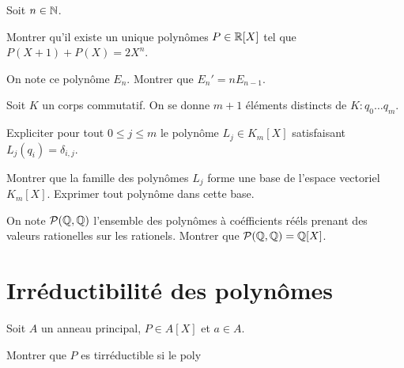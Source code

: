 \documentclass[french]{report}
\begin{document}
\begin{exo}
    Soit \(n\in\mathbb{N}\).
    \begin{q}{1}
        Montrer qu'il existe un unique polynômes \(P\in\mathbb{R}[X]\) tel que
        \(P(X+1)+P(X) = 2X^n\).
    \end{q}
    \begin{q}{2}
        On note ce polynôme \(E_n\). Montrer que \(E_n'=nE_{n-1}\).
    \end{q}
\end{exo}

\begin{exo}
    Soit \(K\) un corps commutatif. On se donne \(m+1\) éléments distincts de \(K\colon
    q_0\dots q_m\).
    \begin{q}{1}
        Expliciter pour tout \(0\leq j\leq m\) le polynôme \(L_j\in K_m[X]\)
        satisfaisant \(L_j(q_i) = \delta_{i,j}\).
    \end{q}
    \begin{q}{2}
        Montrer que la famille des polynômes \(L_j\) forme une base de l'espace vectoriel
        \(K_m[X]\). Exprimer tout polynôme dans cette base.
    \end{q}
    \begin{q}{3}
        On note \(\mathcal{P}(\mathbb{Q}, \mathbb{Q})\) l'ensemble des polynômes à coéfficients rééls prenant des valeurs
        rationelles sur les rationels. Montrer que \(\mathcal{P}(\mathbb{Q}, \mathbb{Q})=\mathbb{Q}[X]\).
    \end{q}
\end{exo}

\section*{Irréductibilité des polynômes}

\begin{exo}
    Soit \(A\) un anneau principal, \(P\in A[X]\) et \(a\in A\).
    \begin{q}{1}
        Montrer que \(P\) es tirréductible si le poly
    \end{q}
\end{exo}
\end{document}
